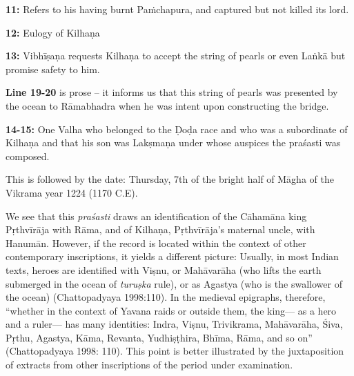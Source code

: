 \smallskip
\noindent
{\bf 11:} Refers to his having burnt Paṁchapura, and captured but not killed its lord.

\smallskip
\noindent
{\bf 12:} Eulogy of Kilhaṇa

\smallskip
\noindent
{\bf 13:} Vibhīṣaṇa requests Kilhaṇa to accept the string of pearls or even Laṅkā but promise safety to him.

\smallskip
\noindent
{\bf Line 19-20} is prose – it informs us that this string of pearls was presented by the ocean to Rāmabhadra when he was intent upon constructing the bridge.

\newpage

\noindent
{\bf 14-15:} One Valha who belonged to the Ḍoḍa race and who was a subordinate of Kilhaṇa and that his son was Lakṣmaṇa under whose auspices the praśasti was composed.

This is followed by the date: Thursday, 7th of the bright half of Māgha of the Vikrama year 1224 (1170 C.E).

We see that this {\sl praśasti} draws an identification of the Cāhamāna king Pṛthvīrāja with Rāma, and of Kilhaṇa, Pṛthvīrāja’s maternal uncle, with Hanumān. However, if the record is located within the context of other contemporary inscriptions, it yields a different picture: Usually, in most Indian texts, heroes are identified with Viṣnu, or Mahāvarāha (who lifts the earth submerged in the ocean of {\sl turuṣka} rule), or as Agastya (who is the swallower of the ocean) (Chattopadyaya 1998:110). In the medieval epigraphs, therefore, “whether in the context of Yavana raids or outside them, the king— as a hero and a ruler— has many identities: Indra, Viṣnu, Trivikrama, Mahāvarāha, Śiva, Pṛthu, Agastya, Kāma, Revanta, Yudhiṣṭhira, Bhīma, Rāma, and so on” (Chattopadyaya 1998: 110). This point is better illustrated by the juxtaposition of extracts from other inscriptions of the period under examination. 

